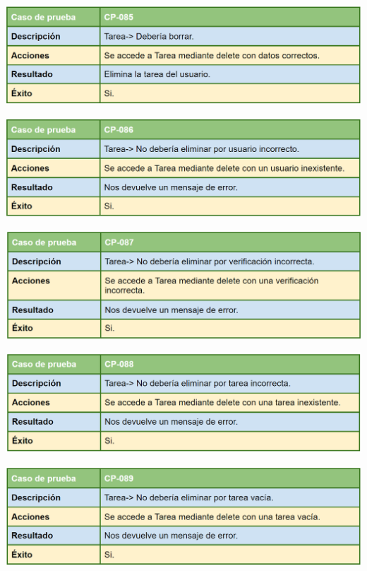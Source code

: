 \bigskip

\includegraphics[width=\textwidth]{img/cap7/cp-085.png}

\bigskip

\includegraphics[width=\textwidth]{img/cap7/cp-086.png}

\bigskip

\includegraphics[width=\textwidth]{img/cap7/cp-087.png}

\bigskip

\includegraphics[width=\textwidth]{img/cap7/cp-088.png}

\bigskip

\includegraphics[width=\textwidth]{img/cap7/cp-089.png}


